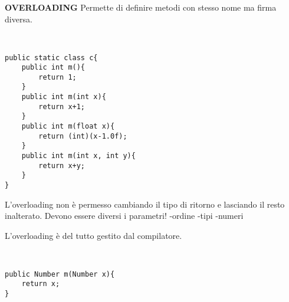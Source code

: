 \noindent \textbf{OVERLOADING} \newline
Permette di definire metodi con stesso nome ma firma diversa. 



\begin{lstlisting}[basicstyle=\small,]


public static class c{
	public int m(){
		return 1;
	}
	public int m(int x){
		return x+1;
	}
	public int m(float x){
		return (int)(x-1.0f);
	}
	public int m(int x, int y){
		return x+y;
	}		
}

\end{lstlisting}

\noindent L'overloading non è permesso cambiando il tipo di ritorno e lasciando il resto inalterato. Devono essere diversi i parametri! \newline
-ordine \newline
-tipi \newline
-numeri \newline

\noindent L'overloading è del tutto gestito dal compilatore.

\begin{lstlisting}[basicstyle=\small,]


public Number m(Number x){
	return x;
}

\end{lstlisting}























